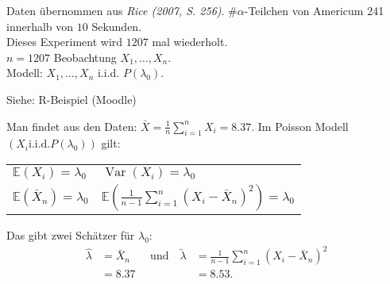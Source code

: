 \documentclass{tstextbook}
\DeclareMathOperator{\Var}{Var}
\newcommand{\E}{\mathbb E}
\begin{document}
\begin{example} Daten übernommen aus \textit{Rice (2007, S. 256)}.
	$ \# \alpha $-Teilchen von Americum 241 innerhalb von $ 10 $ Sekunden. \\
	Dieses Experiment wird $ 1207 $ mal wiederholt.\\
	$ n=1207 $ Beobachtung $ X_1,\ldots,X_n. $\\
	Modell: $ X_1,\ldots,X_n $ i.i.d. $ P(\lambda_0). $
	
	Siehe: R-Beispiel (Moodle)
	
	Man findet aus den Daten: $ \bar{X} = \frac{1}{n} \sum_{i=1}^{n} X_i = 8.37 $.
	Im Poisson Modell $ (X_i \text{i.i.d.} P(\lambda_0)) $ gilt: 
	
	\begin{tabular}{ll}
		$ \E(X_i)=\lambda_0 $ 			& $ \Var(X_i) = \lambda_0 $ \\
		$ \E(\bar{X}_n) = \lambda_0 $ 	& $ \E\left(\frac{1}{n-1} \sum_{i=1}^{n}(X_i - \bar{X}_n)^2\right) = \lambda_0 $
	\end{tabular}
	
	Das gibt zwei Schätzer für $ \lambda_0 $:
	\[
	\begin{aligned}
		\hat{\lambda} & = \bar{X}_n \quad & \text{und} \quad \tilde{\lambda} & = \frac{1}{n-1} \sum_{i=1}^{n}(X_i - \bar{X}_n)^2 \\
		& = 8.37 & 						& = 8.53.
	\end{aligned}
	\]
	

\end{example}
\end{document}
